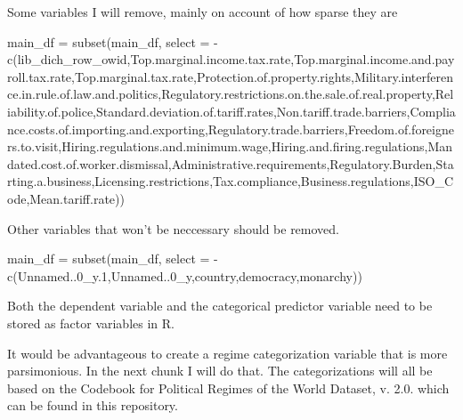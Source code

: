 \documentclass[
]{article}
\newenvironment{Shaded}{\begin{snugshade}}{\end{snugshade}}
\newcommand{\AttributeTok}[1]{\textcolor[rgb]{0.77,0.63,0.00}{#1}}
\newcommand{\FloatTok}[1]{\textcolor[rgb]{0.00,0.00,0.81}{#1}}
\newcommand{\FunctionTok}[1]{\textcolor[rgb]{0.00,0.00,0.00}{#1}}
\newcommand{\NormalTok}[1]{#1}
\newcommand{\OtherTok}[1]{\textcolor[rgb]{0.56,0.35,0.01}{#1}}
\newcommand{\SpecialCharTok}[1]{\textcolor[rgb]{0.00,0.00,0.00}{#1}}
\begin{document}
Some variables I will remove, mainly on account of how sparse they are

\begin{Shaded}
\begin{Highlighting}[]
\NormalTok{main\_df }\OtherTok{=} \FunctionTok{subset}\NormalTok{(main\_df, }\AttributeTok{select =} \SpecialCharTok{{-}}\FunctionTok{c}\NormalTok{(lib\_dich\_row\_owid,Top.marginal.income.tax.rate,Top.marginal.income.and.payroll.tax.rate,Top.marginal.tax.rate,Protection.of.property.rights,Military.interference.in.rule.of.law.and.politics,Regulatory.restrictions.on.the.sale.of.real.property,Reliability.of.police,Standard.deviation.of.tariff.rates,Non.tariff.trade.barriers,Compliance.costs.of.importing.and.exporting,Regulatory.trade.barriers,Freedom.of.foreigners.to.visit,Hiring.regulations.and.minimum.wage,Hiring.and.firing.regulations,Mandated.cost.of.worker.dismissal,Administrative.requirements,Regulatory.Burden,Starting.a.business,Licensing.restrictions,Tax.compliance,Business.regulations,ISO\_Code,Mean.tariff.rate))}
\end{Highlighting}
\end{Shaded}

Other variables that won't be neccessary should be removed.

\begin{Shaded}
\begin{Highlighting}[]
\NormalTok{main\_df }\OtherTok{=} \FunctionTok{subset}\NormalTok{(main\_df, }\AttributeTok{select =} \SpecialCharTok{{-}}\FunctionTok{c}\NormalTok{(Unnamed..0\_y}\FloatTok{.1}\NormalTok{,Unnamed..0\_y,country,democracy,monarchy))}
\end{Highlighting}
\end{Shaded}

Both the dependent variable and the categorical predictor variable need
to be stored as factor variables in R.

\begin{Shaded}
\end{Shaded}

It would be advantageous to create a regime categorization variable that
is more parsimonious. In the next chunk I will do that. The
categorizations will all be based on the Codebook for Political Regimes
of the World Dataset, v. 2.0. which can be found in this repository.
\end{document}
